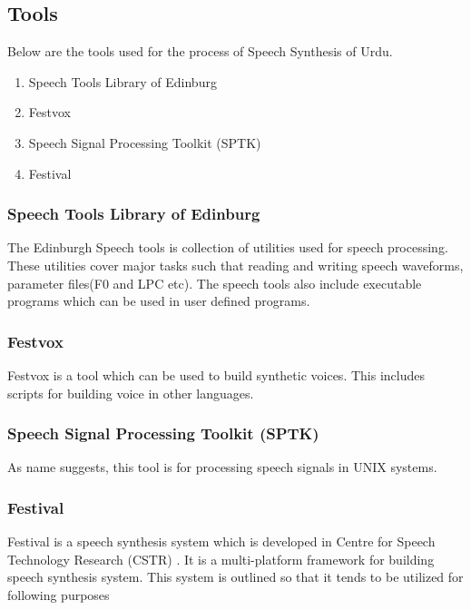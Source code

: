 \begin{itemize}
\subsection{Tools}

Below are the tools used for the process of Speech Synthesis of Urdu.

\begin{enumerate}
  \item Speech Tools Library of Edinburg
  \item Festvox
  \item Speech Signal Processing Toolkit (SPTK)
  \item Festival
\end{enumerate}

\subsubsection{Speech Tools Library of Edinburg}
The Edinburgh Speech tools is collection of utilities used for speech processing. These utilities cover major tasks such that reading and 
writing speech waveforms, parameter files(F0 and LPC etc). The speech tools also include executable programs which can 
be used in user defined programs.


\subsubsection{Festvox}
Festvox is a tool which can be used to build synthetic voices. This includes scripts for building voice in other languages.

\subsubsection{ Speech Signal Processing Toolkit (SPTK)}
As name suggests, this tool is for processing speech signals in UNIX systems. 

\subsubsection{Festival}

Festival \cite{thefestivalspeechsynthesissystem} is a speech synthesis system which is developed in Centre for Speech Technology Research (CSTR) \cite{centreforspeechtechnologyresearch}. It is a multi-platform framework for building speech synthesis system. This system is outlined so that it tends to be utilized for following purposes


\end{itemize}
